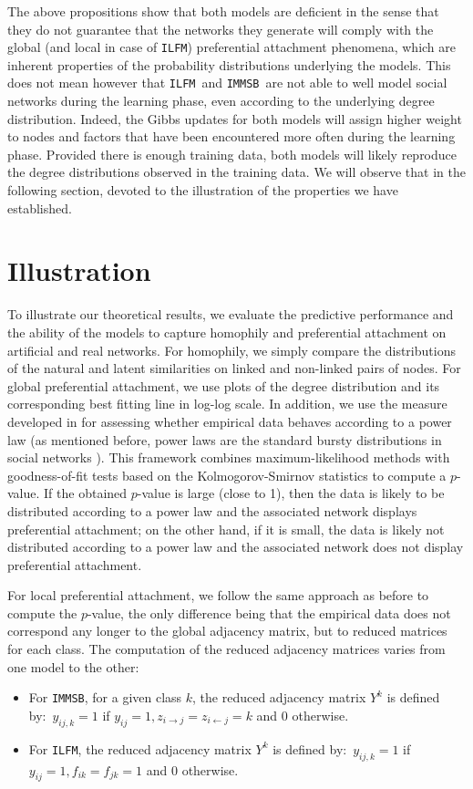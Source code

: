 \documentclass[conference]{IEEEtran}
\newcommand{\ifm}{\texttt{ILFM}}
\newcommand{\imb}{\texttt{IMMSB}}
\begin{document}
The above propositions show that both models are deficient in the sense that they do not guarantee that the networks they generate will comply with the global (and local in case of \ifm) preferential attachment phenomena, which are inherent properties of the probability distributions underlying the models. This does not mean however that \ifm\ and \imb\ are not able to well model social networks during the learning phase, even according to the underlying degree distribution. Indeed, the Gibbs updates for both models will assign higher weight to nodes and factors that have been encountered more often during the learning phase. Provided there is enough training data, both models will likely reproduce the degree distributions observed in the training data. We will observe that in the following section, devoted to the illustration of the properties we have established.

\section{Illustration}
\label{sec:exps}

To illustrate our theoretical results, we evaluate the predictive performance and the ability of the models to capture homophily and preferential attachment on artificial and real networks. For homophily, we simply compare the distributions of the natural and latent similarities on linked and non-linked pairs of nodes. For global preferential attachment, we use plots of the degree distribution and its corresponding best fitting line in log-log scale. In addition, we use the measure developed in \cite{clauset2009power} for assessing whether empirical data behaves according to a power law (as mentioned before, power laws are the standard bursty distributions in social networks \cite{barabasi1999emergence}). This framework combines maximum-likelihood methods with goodness-of-fit tests based on the Kolmogorov-Smirnov statistics to compute a $p$-value. If the obtained $p$-value is large (close to 1), then the data is likely to be distributed according to a power law and the associated network displays preferential attachment;  on the other hand, if it is small, the data is likely not distributed according to a power law and the associated network does not display preferential attachment.

For local preferential attachment, we follow the same approach as before to compute the $p$-value, the only difference being that the empirical data does not correspond any longer to the global adjacency matrix, but to reduced matrices for each class. The computation of the reduced adjacency matrices varies from one model to the other:
%
\begin{itemize}
    \item For \imb, for a given class $k$, the reduced adjacency matrix $Y^k$ is defined by:~$y_{ij,k}=1$ if $y_{ij}=1, z_{i\rightarrow j}=z_{i\leftarrow j}=k$ and $0$ otherwise.
    \item For \ifm, the reduced adjacency matrix $Y^k$ is defined by:~$ y_{ij,k}=1$ if $y_{ij}=1 , f_{ik}=f_{jk}=1$ and $0$ otherwise.
\end{itemize}~\\
\end{document}
